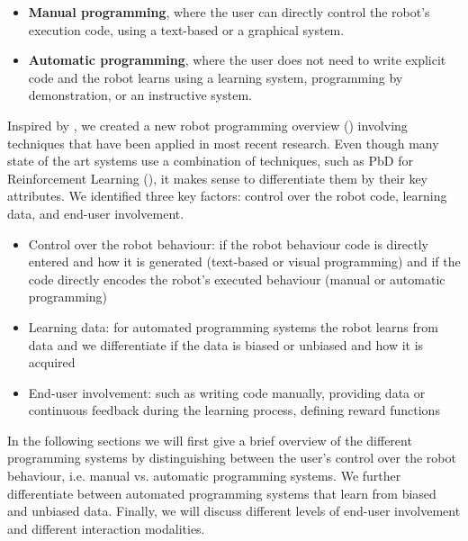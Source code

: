 \begin{itemize}
  \item {\textbf{Manual programming}, where the user can directly control the robot's execution code, using a text-based or a graphical system.}
  \item {\textbf{Automatic programming}, where the user does not need to write explicit code and the robot learns using a learning system, programming by demonstration, or an instructive system.}
\end{itemize}


Inspired by \cite{Biggs2003}, we created a new robot programming overview () involving techniques that have been applied in most recent research.
Even though many state of the art systems use a combination of techniques, such as PbD for Reinforcement Learning (\cite{hester2017learning}), it makes sense to differentiate them by their key attributes.
We identified three key factors: control over the robot code, learning data, and end-user involvement.
\begin{itemize}
	\item Control over the robot behaviour: if the robot behaviour code is directly entered and how it is generated (text-based or visual programming) and if the code directly encodes the robot's executed behaviour (manual or automatic programming)
	\item Learning data: for automated programming systems the robot learns from data and we differentiate if the data is biased or unbiased and how it is acquired
	\item End-user involvement: such as writing code manually, providing data or continuous feedback during the learning process, defining reward functions
\end{itemize}

In the following sections we will first give a brief overview of the different programming systems by distinguishing between the user's control over the robot behaviour, i.e. manual vs. automatic programming systems.
We further differentiate between automated programming systems that learn from biased and unbiased data.
Finally, we will discuss different levels of end-user involvement and different interaction modalities.

